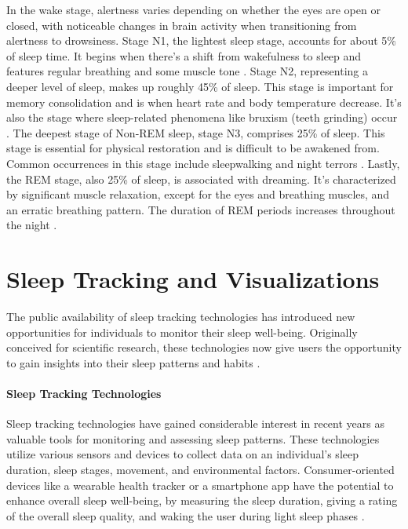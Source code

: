 \documentclass[
  a4paper,  %
  twoside,  %
  bibliography=totoc,
  headsepline,
  cleardoublepage=empty,
  parskip=half,
  draft=false
]{scrbook}
\begin{document}
In the wake stage, alertness varies depending on whether the eyes are open or closed, with noticeable changes in brain activity when transitioning from alertness to drowsiness. Stage N1, the lightest sleep stage, accounts for about 5\% of sleep time. It begins when there's a shift from wakefulness to sleep and features regular breathing and some muscle tone \cite{malik_sleep-wake_2018}. Stage N2, representing a deeper level of sleep, makes up roughly 45\% of sleep. This stage is important for memory consolidation and is when heart rate and body temperature decrease. It's also the stage where sleep-related phenomena like bruxism (teeth grinding) occur \cite{antony_sleep_2019}. The deepest stage of Non-REM sleep, stage N3, comprises 25\% of sleep. This stage is essential for physical restoration and is difficult to be awakened from. Common occurrences in this stage include sleepwalking and night terrors \cite{hilditch_sleep_2019}. Lastly, the REM stage, also 25\% of sleep, is associated with dreaming. It's characterized by significant muscle relaxation, except for the eyes and breathing muscles, and an erratic breathing pattern. The duration of REM periods increases throughout the night \cite{della_monica_rapid_2018}.


\section{Sleep Tracking and Visualizations}
The public availability of sleep tracking technologies has introduced new opportunities for individuals to monitor their sleep well-being. Originally conceived for scientific research, these technologies now give users the opportunity to gain insights into their sleep patterns and habits \cite{Challenges_Oppotunieties_SleepTracking}.
\paragraph{Sleep Tracking Technologies}
Sleep tracking technologies have gained considerable interest in recent years as valuable tools for monitoring and assessing sleep patterns. These technologies utilize various sensors and devices to collect data on an individual's sleep duration, sleep stages, movement, and environmental factors. Consumer-oriented devices like a wearable health tracker or a smartphone app have the potential to enhance overall sleep well-being, by measuring the sleep duration, giving a rating of the overall sleep quality, and waking the user during light sleep phases \cite{Consumer_SleepTracking}.
\end{document}
